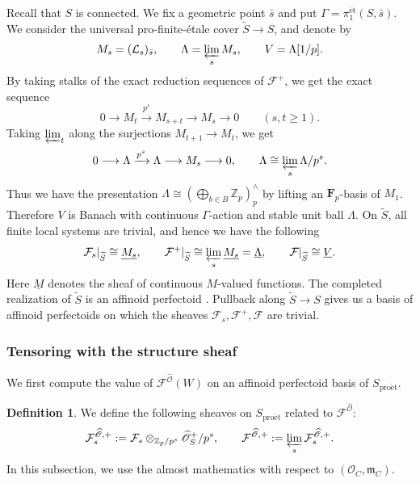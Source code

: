 \documentclass[11pt]{article}
\theoremstyle{definition}
\newtheorem{definition}[theorem]{Definition}
\newcommand{\Zp}{\mathbb Z_p}
\newcommand{\cO}{\mathcal O}
\newcommand{\cF}{\mathcal F}
\newcommand{\proet}{\mathrm{pro\acute et}}
\newcommand{\et}{\mathrm{\acute et}}
\begin{document}
Recall that $S$ is connected. We fix a geometric point $\bar s$ and put $\Gamma=\pi_1^{\et}(S,\bar s)$.
We consider the universal pro-finite-\'etale cover $\widetilde{S}\longrightarrow S$, and denote by
\begin{gather*}
 M_s=(\mathcal L_s)_{\bar s},\qquad
 \Lambda=\varprojlim_s M_s,\qquad V=\Lambda[1/p].
\end{gather*}
By taking stalks of the exact reduction sequences of \(\mathcal F^+\), we get the exact sequence
\[
 0\longrightarrow M_t\xrightarrow{p^s}M_{s+t}
 \longrightarrow M_s\longrightarrow0
 \qquad(s,t\geq1).
\]
Taking \(\varprojlim_t\) along the surjections
\(M_{t+1}\to M_t\), we get
\begin{equation}%
 0\longrightarrow\Lambda\xrightarrow{p^s}\Lambda
 \longrightarrow M_s\longrightarrow0,\qquad
 \Lambda\cong\varprojlim_s\Lambda/p^s.
\end{equation} Thus we have the presentation
\(\Lambda\cong(\bigoplus_{b\in B}\Zp)^\wedge_p\) 
by lifting an \(\mathbf F_p\)-basis of \(M_1\).
Therefore \(V\) is Banach with continuous \(\Gamma\)-action and
stable unit ball \(\Lambda\).  On $\widetilde{S}$, all finite local systems are trivial,
and hence we have the following
\begin{equation}\label{eq:general-geometric-trivialization}
 \mathcal F_s|_{\widetilde{S}}\cong\underline{M_s},\qquad
 \mathcal F^+|_{\widetilde{S}}\cong
 \varprojlim_s\underline{M_s}=\underline\Lambda,\qquad
 \mathcal F|_{\widetilde{S}}\cong\underline V.
\end{equation}
Here \(\underline M\) denotes the sheaf of continuous \(M\)-valued functions.
The completed realization of \(\widetilde{S}\) is an affinoid perfectoid
\cite[Theorem~4.9 and its proof]{ScholzeRigid}. Pullback along $\widetilde{S}\to S$ gives us
a basis of affinoid perfectoids on which the sheaves $\cF_s, \cF^+, \cF$ are trivial.

\subsubsection{Tensoring with the structure sheaf}
We first compute the value of $\cF^{\widehat{\mathscr{O}}}(W)$ on an affinoid perfectoid basis of $S_{\proet}$.
\begin{definition}%
\label{def:general-structural-coefficients}
We define the following sheaves on $S_{\proet}$ related to $\cF^{\widehat{\mathscr{O}}}$: 
\[
 \mathcal F_s^{\widehat{\mathscr O},+}
 :=\mathcal F_s\otimes_{\Zp/p^s}\widehat{\mathscr O}_S^+/p^s,
 \qquad
 \mathcal F^{\widehat{\mathscr O},+}
 :=\varprojlim_s\mathcal F_s^{\widehat{\mathscr O},+}.
\]
In this subsection, we use the almost mathematics with respect to
\((\cO_C,\mathfrak m_C)\).
\end{definition}
\end{document}
